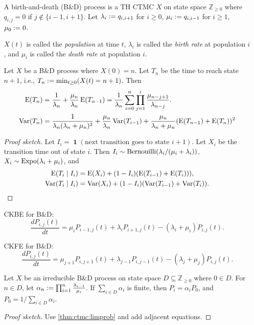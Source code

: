 \documentclass[a4paper, 12pt, fleqn]{article}
\DeclareMathOperator{\boolone}{\mathbf{1}}
\DeclareMathOperator{\Expo}{\opname{Expo}}
\begin{document}
\begin{definition}
A birth-and-death (B\&D) process is a TH CTMC $X$ on state space $\mathbb{Z}_{\ge 0}$ where
$q_{i,j} = 0$ if $j \not\in \{i-1, i+1\}$. Let $\lambda_i := q_{i,i+1}$ for $i \ge 0$,
$\mu_i := q_{i,i-1}$ for $i \ge 1$, $\mu_0 := 0$.

$X(t)$ is called the \emph{population} at time $t$,
$\lambda_i$ is called the \emph{birth rate} at population $i$,
and $\mu_i$ is called the \emph{death rate} at population $i$.
\end{definition}

\begin{lemma}
Let $X$ be a B\&D process where $X(0)=n$.
Let $T_n$ be the time to reach state $n+1$, i.e., $T_n := \min_{t \ge 0} (X(t) = n+1)$. Then
\begin{align*}
\operatorname*{E}(T_n) &= \frac{1}{\lambda_n} + \frac{\mu_n}{\lambda_n}\operatorname*{E}(T_{n-1})
= \frac{1}{\lambda_n}\sum_{i=0}^n \prod_{j=1}^i \frac{\mu_{n-j+1}}{\lambda_{n-j}}.
\\ \operatorname*{Var}(T_n) &= \frac{1}{\lambda_n(\lambda_n + \mu_n)^2} + \frac{\mu_n}{\lambda_n}\operatorname*{Var}(T_{i-1})
    + \frac{\mu_n}{\lambda_n + \mu_n}(\operatorname*{E}(T_{n-1}) + \operatorname*{E}(T_n))^2
\end{align*}
\end{lemma}
\begin{proof}[Proof sketch]
Let $I_i = \boolone(\textrm{next transition goes to state } i+1)$.
Let $X_i$ be the transition time out of state $i$.
Then $I_i \sim \operatorname{Bernouilli}(\lambda_i/(\mu_i + \lambda_i))$,
$X_i \sim \Expo(\lambda_i + \mu_i)$, and
\begin{align*}
\operatorname*{E}(T_i \mid I_i) &= \operatorname*{E}(X_i) + (1-I_i)(\operatorname*{E}(T_{i-1}) + \operatorname*{E}(T_i))),
\\ \operatorname*{Var}(T_i \mid I_i) &= \operatorname*{Var}(X_i) + (1-I_i)(\operatorname*{Var}(T_{i-1}) + \operatorname*{Var}(T_i)).
\qedhere \end{align*}
\end{proof}

CKBE for B\&D:
\[ \frac{dP_{i,j}(t)}{dt} = \mu_iP_{i-1,j}(t) + \lambda_iP_{i+1,j}(t) - (\lambda_i + \mu_i)P_{i,j}(t). \]

CKFE for B\&D:
\[ \frac{dP_{i,j}(t)}{dt} = \mu_{j+1}P_{i,j+1}(t) + \lambda_{j-1}P_{i,j-1}(t) - (\lambda_j + \mu_j)P_{i,j}(t). \]

\begin{theorem}
Let $X$ be an irreducible B\&D process on state space $D \subseteq \mathbb{Z}_{\ge 0}$ where $0 \in D$.
For $n \in D$, let $\alpha_n := \prod_{i=1}^n \frac{\lambda_{i-1}}{\mu_i}$.
If $\sum_{i \in D} \alpha_i$ is finite, then
$P_i = \alpha_iP_0$, and $P_0 = 1/\sum_{i \in D} \alpha_i$.
\end{theorem}
\begin{proof}[Proof sketch]
Use \cref{thm:ctmc:limprob} and add adjacent equations.
\end{proof}
\end{document}
